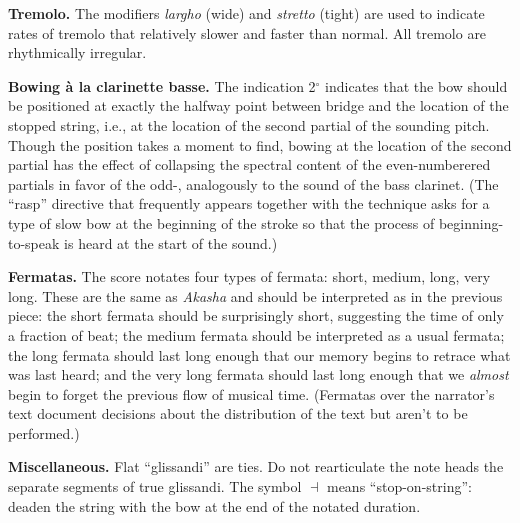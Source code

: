 \textbf{Tremolo.} The modifiers \textit{largho} (wide) and \textit{stretto} (tight) are
used to indicate rates of tremolo that relatively slower and faster than normal. All
tremolo are rhythmically irregular.

\textbf{Bowing à la clarinette basse.} The indication 2$^\circ$ indicates that the bow
should be positioned at exactly the halfway point between bridge and the location of the
stopped string, i.e., at the location of the second partial of the sounding pitch. Though
the position takes a moment to find, bowing at the location of the second partial has the
effect of collapsing the spectral content of the even-numberered partials in favor of the
odd-, analogously to the sound of the bass clarinet. (The ``rasp'' directive that
frequently appears together with the technique asks for a type of slow bow at the
beginning of the stroke so that the process of beginning-to-speak is heard at the start
of the sound.)

\textbf{Fermatas.} The score notates four types of fermata: short, medium, long, very
long. These are the same as \textit{Akasha} and should be interpreted as in the previous
piece: the short fermata should be surprisingly short, suggesting the time of only a
fraction of beat; the medium fermata should be interpreted as a usual fermata; the long
fermata should last long enough that our memory begins to retrace what was last heard;
and the very long fermata should last long enough that we \textit{almost} begin to forget
the previous flow of musical time. (Fermatas over the narrator's text document decisions
about the distribution of the text but aren't to be performed.)

\textbf{Miscellaneous.} Flat ``glissandi'' are ties. Do not rearticulate the note heads
the separate segments of true glissandi. The symbol $\dashv$ means ``stop-on-string'':
deaden the string with the bow at the end of the notated duration.
